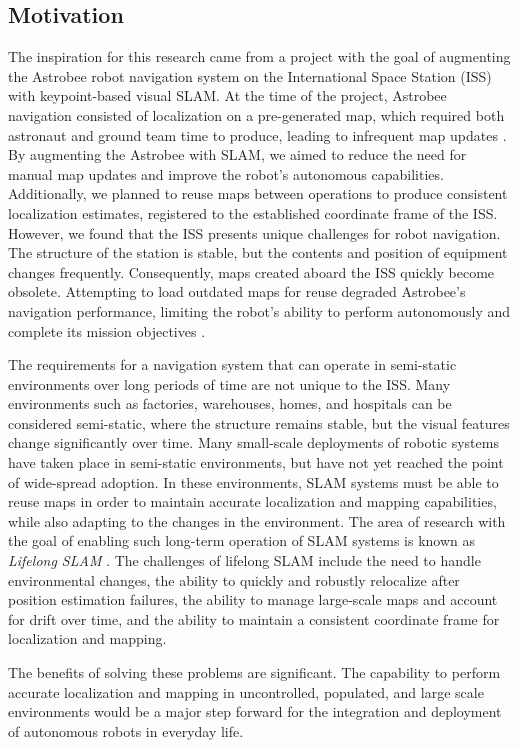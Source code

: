 \subsection{Motivation}


The inspiration for this research came from a project with the goal of augmenting the Astrobee robot navigation system on the International Space Station (ISS) with keypoint-based visual SLAM. At the time of the project, Astrobee navigation consisted of localization on a pre-generated map, which required both astronaut and ground team time to produce, leading to infrequent map updates \cite{soussanAstroLocEfficientRobust2022}. By augmenting the Astrobee with SLAM, we aimed to reduce the need for manual map updates and improve the robot's autonomous capabilities. Additionally, we planned to reuse maps between operations to produce consistent localization estimates, registered to the established coordinate frame of the ISS. However, we found that the ISS presents unique challenges for robot navigation. The structure of the station is stable, but the contents and position of equipment changes frequently. Consequently, maps created aboard the ISS quickly become obsolete. Attempting to load outdated maps for reuse degraded Astrobee's navigation performance, limiting the robot's ability to perform autonomously and complete its mission objectives \cite{zuralesCollaborativeSensingMapping2024}.


The requirements for a navigation system that can operate in semi-static environments over long periods of time are not unique to the ISS. Many environments such as factories, warehouses, homes, and hospitals can be considered semi-static, where the structure remains stable, but the visual features change significantly over time. Many small-scale deployments of robotic systems have taken place in semi-static environments, but have not yet reached the point of wide-spread adoption. In these environments, SLAM systems must be able to reuse maps in order to maintain accurate localization and mapping capabilities, while also adapting to the changes in the environment. The area of research with the goal of enabling such long-term operation of SLAM systems is known as \textit{Lifelong SLAM} \cite{bujancaRobustSLAMSystems2021}. The challenges of lifelong SLAM include the need to handle environmental changes, the ability to quickly and robustly relocalize after position estimation failures, the ability to manage large-scale maps and account for drift over time, and the ability to maintain a consistent coordinate frame for localization and mapping.


The benefits of solving these problems are significant. The capability to perform accurate localization and mapping in uncontrolled, populated, and large scale environments would be a major step forward for the integration and deployment of autonomous robots in everyday life.